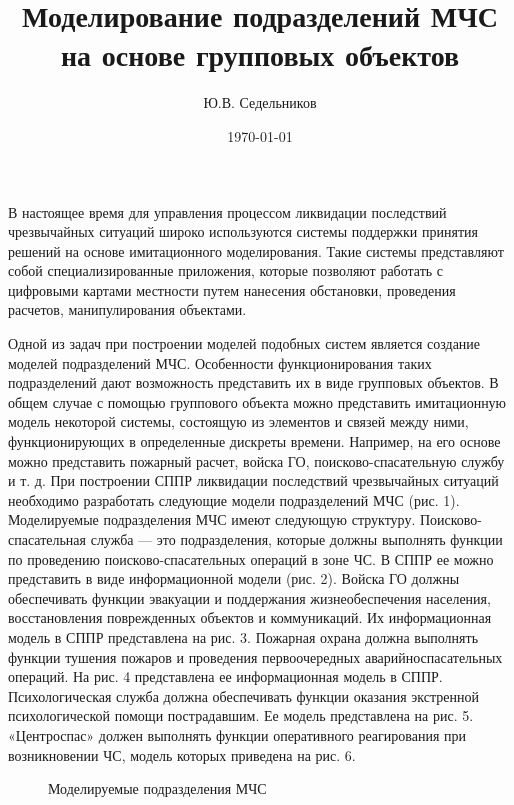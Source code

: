 \documentclass[12pt]{article}
\begin{document}
\title{Моделирование подразделений МЧС на основе
групповых объектов}

\author{Ю.В. Седельников}
\date{\today}
\maketitle

\abstract
В настоящее время для управления процессом ликвидации последствий чрезвычайных
ситуаций широко используются системы поддержки принятия решений на основе
имитационного моделирования. Такие системы представляют собой специализированные
приложения, которые позволяют работать с цифровыми картами местности путем нанесения
обстановки, проведения расчетов, манипулирования объектами.


Одной из задач при построении моделей подобных
систем является создание моделей подразделений
МЧС. Особенности функционирования таких подразделений дают возможность представить их в виде групповых объектов.
В общем случае с помощью группового объекта
можно представить имитационную модель некоторой
системы, состоящую из элементов и связей между ними, функционирующих в определенные дискреты времени. Например, на его основе можно представить пожарный расчет, войска ГО, поисково-спасательную
службу и т. д.
При построении СППР ликвидации последствий
чрезвычайных ситуаций необходимо разработать следующие модели подразделений МЧС (рис. 1).
Моделируемые подразделения МЧС имеют следующую структуру.
Поисково-спасательная служба — это подразделения, которые должны выполнять функции по проведению поисково-спасательных операций в зоне ЧС.
В СППР ее можно представить в виде информационной модели (рис. 2).
Войска ГО должны обеспечивать функции эвакуации и поддержания жизнеобеспечения населения, восстановления поврежденных объектов и коммуникаций.
Их информационная модель в СППР представлена
на рис. 3.
Пожарная охрана должна выполнять функции тушения пожаров и проведения первоочередных аварийноспасательных операций. На рис. 4 представлена ее информационная модель в СППР.
Психологическая служба должна обеспечивать
функции оказания экстренной психологической помощи пострадавшим. Ее модель представлена
на рис. 5.
«Центроспас» должен выполнять функции оперативного реагирования при возникновении ЧС, модель которых приведена на рис. 6.

\begin{figure}
\caption{Моделируемые подразделения МЧС}
\end{figure}
\end{document}
